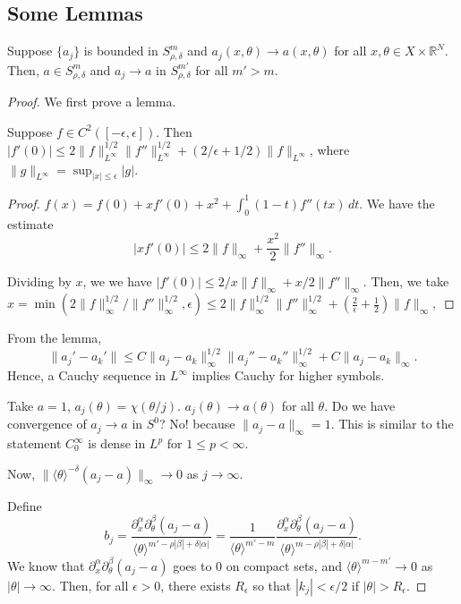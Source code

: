 \documentclass[12pt]{scrartcl}
\newcommand{\R}{\mathbb{R}}
\newcommand{\<}{\langle}
\renewcommand{\>}{\rangle}
\begin{document}
\subsection{Some Lemmas}
\begin{proposition} Suppose $\{a_j\}$ is bounded in $S_{\rho, \delta}^m$ and $a_j(x, \theta) \to a(x, \theta)$ for all $x, \theta \in X \times \R^N$. Then, $a \in S_{\rho, \delta}^m$ and $a_j \to a$ in $S_{\rho, \delta}^{m'}$ for all $m' > m$.
\end{proposition}
\begin{proof}
We first prove a lemma.  
\begin{lemma} Suppose $f \in C^2([-\epsilon, \epsilon])$.  Then $|f'(0)| \le 2 \|f\|_{L^\infty}^{1/2} \|f''\|_{L^\infty}^{1/2} + (2/\epsilon + 1/2) \|f\|_{L^\infty}$, where $\|g\|_{L^\infty} = \sup_{|x|\le \epsilon} |g|$.
\end{lemma}
\begin{proof}
$f(x) = f(0) + xf'(0) + x^2 + \int_0^1 (1 - t)f''(tx)\,dt$. We have the estimate 
$$|x f'(0)| \le 2\|f\|_\infty + \frac{x^2}{2}\|f''\|_\infty.$$

Dividing by $x$, we we have $|f'(0)| \le 2/x\|f\|_\infty +x/2 \|f''\|_\infty$.  Then, we take $x = \min(2 \|f\|_\infty^{1/2}/\|f''\|_\infty^{1/2}, \epsilon) \le 2\|f\|_\infty^{1/2}\|f''\|_\infty^{1/2} + (\frac{2}{\epsilon} + \frac{1}{2})\|f\|_\infty,$
\end{proof}
From the lemma,
$$\|a_j' - a_k'\| \le C\|a_j - a_k\|_{\infty}^{1/2} \|a_j'' - a_k''\|_{\infty}^{1/2} + C \|a_j - a_k\|_\infty.$$
Hence, a Cauchy sequence in $L^\infty$ implies Cauchy for higher symbols.      

\begin{example} Take $a = 1$, $a_j(\theta) = \chi(\theta/j)$.  $a_j(\theta) \to a(\theta)$ for all $\theta$.  Do we have convergence of $a_j \to a$ in $S^0$?  No! because $\|a_j - a\|_\infty = 1$.  This is similar to the statement $C_0^\infty$ is dense in $L^p$ for $1 \le p < \infty$.

Now, $\|\<\theta\>^{-\delta}(a_j - a)\|_\infty \to 0$ as $j \to \infty$.  
\end{example}
Define $$b_j = \frac{\partial_x^\alpha \partial_\theta^\beta (a_j - a)}{\<\theta\>^{m' - \rho|\beta| + \delta|\alpha|}} = \frac{1}{\<\theta\>^{m' - m}} \frac{\partial_x^\alpha \partial_\theta^\beta(a_j - a)}{\<\theta\>^{m - \rho|\beta| + \delta|\alpha|}}.$$
We know that $\partial_x^\alpha \partial_\theta^\beta(a_j - a)$ goes to $0$ on compact sets, and $\<\theta\>^{m - m'} \to 0$ as $|\theta| \to \infty$.  Then, for all $\epsilon > 0$, there exists $R_\epsilon$ so that $|k_j| < \epsilon/2$ if $|\theta| > R_\epsilon$. 

\end{proof}
\end{document}
